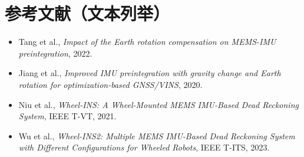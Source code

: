 \documentclass[11pt]{article}
\begin{document}
\section{参考文献（文本列举）}
\begin{itemize}
  \item Tang et al., \emph{Impact of the Earth rotation compensation on MEMS-IMU preintegration}, 2022.
  \item Jiang et al., \emph{Improved IMU preintegration with gravity change and Earth rotation for optimization-based GNSS/VINS}, 2020.
  \item Niu et al., \emph{Wheel-INS: A Wheel-Mounted MEMS IMU-Based Dead Reckoning System}, IEEE T-VT, 2021.
  \item Wu et al., \emph{Wheel-INS2: Multiple MEMS IMU-Based Dead Reckoning System with Different Configurations for Wheeled Robots}, IEEE T-ITS, 2023.
\end{itemize}
\end{document}
